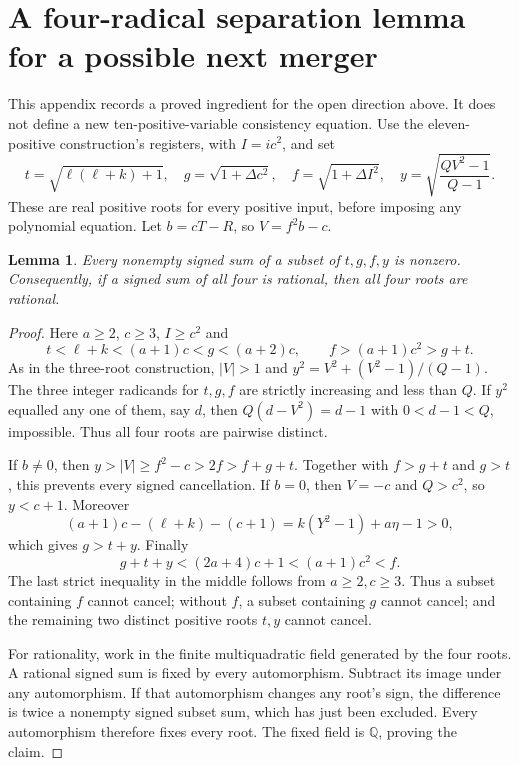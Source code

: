 \documentclass[11pt,letterpaper]{article}
\newcommand{\Q}{\mathbb Q}
\newtheorem{lemma}[theorem]{Lemma}
\theoremstyle{definition}
\theoremstyle{remark}
\begin{document}
\appendix
\section{A four-radical separation lemma for a possible next merger}
\label{app:four}

This appendix records a proved ingredient for the open direction above.
It does not define a new ten-positive-variable consistency equation.
Use the eleven-positive construction's registers, with $I=ic^2$, and set
\[
 t=\sqrt{\ell(\ell+k)+1},\quad
 g=\sqrt{1+\Delta c^2},\quad
 f=\sqrt{1+\Delta I^2},\quad
 y=\sqrt{\frac{QV^2-1}{Q-1}}.
\]
These are real positive roots for every positive input, before imposing
any polynomial equation. Let $b=cT-R$, so $V=f^2b-c$.

\begin{lemma}
Every nonempty signed sum of a subset of $t,g,f,y$ is nonzero.
Consequently, if a signed sum of all four is rational, then all four
roots are rational.
\end{lemma}
\begin{proof}
Here $a\ge2$, $c\ge3$, $I\ge c^2$ and
\[
 t<\ell+k<(a+1)c<g<(a+2)c,
 \qquad f>(a+1)c^2>g+t.
\]
As in the three-root construction, $|V|>1$ and
$y^2=V^2+(V^2-1)/(Q-1)$. The three integer radicands for $t,g,f$
are strictly increasing and less than $Q$. If $y^2$ equalled any one
of them, say $d$, then $Q(d-V^2)=d-1$ with $0<d-1<Q$, impossible.
Thus all four roots are pairwise distinct.

If $b\ne0$, then $y>|V|\ge f^2-c>2f>f+g+t$.
Together with $f>g+t$ and $g>t$, this prevents every signed cancellation.
If $b=0$, then $V=-c$ and $Q>c^2$, so $y<c+1$. Moreover
\[
 (a+1)c-(\ell+k)-(c+1)
   =k(Y^2-1)+a\eta-1>0,
\]
which gives $g>t+y$. Finally
\[
 g+t+y<(2a+4)c+1<(a+1)c^2<f.
\]
The last strict inequality in the middle follows from $a\ge2,c\ge3$.
Thus a subset containing $f$ cannot cancel; without $f$, a subset
containing $g$ cannot cancel; and the remaining two distinct positive
roots $t,y$ cannot cancel.

For rationality, work in the finite multiquadratic field generated by
the four roots. A rational signed sum is fixed by every automorphism.
Subtract its image under any automorphism. If that automorphism changes
any root's sign, the difference is twice a nonempty signed subset sum,
which has just been excluded. Every automorphism therefore fixes every
root. The fixed field is $\Q$, proving the claim.
\end{proof}
\end{document}
